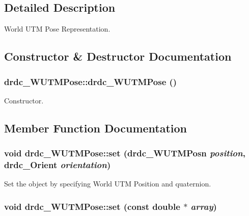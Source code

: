 \subsection{Detailed Description}
World UTM Pose Representation. 



\subsection{Constructor \& Destructor Documentation}
\hypertarget{classdrdc__WUTMPose_6b93e540205bcbd934e6425ef5b09802}{
\subsubsection[drdc\_\-WUTMPose]{\setlength{\rightskip}{0pt plus 5cm}drdc\_\-WUTMPose::drdc\_\-WUTMPose ()}}
\label{classdrdc__WUTMPose_6b93e540205bcbd934e6425ef5b09802}


Constructor. 



\subsection{Member Function Documentation}
\hypertarget{classdrdc__WUTMPose_39ae2ab40c9e7bed0b394649f3b373c2}{
\subsubsection[set]{\setlength{\rightskip}{0pt plus 5cm}void drdc\_\-WUTMPose::set ({\bf drdc\_\-WUTMPosn} {\em position}, \/  {\bf drdc\_\-Orient} {\em orientation})}}
\label{classdrdc__WUTMPose_39ae2ab40c9e7bed0b394649f3b373c2}


Set the object by specifying World UTM Position and quaternion. 

\hypertarget{classdrdc__WUTMPose_aede572f074b7051fc391917ed225854}{
\subsubsection[set]{\setlength{\rightskip}{0pt plus 5cm}void drdc\_\-WUTMPose::set (const double $\ast$ {\em array})}}
\label{classdrdc__WUTMPose_aede572f074b7051fc391917ed225854}


